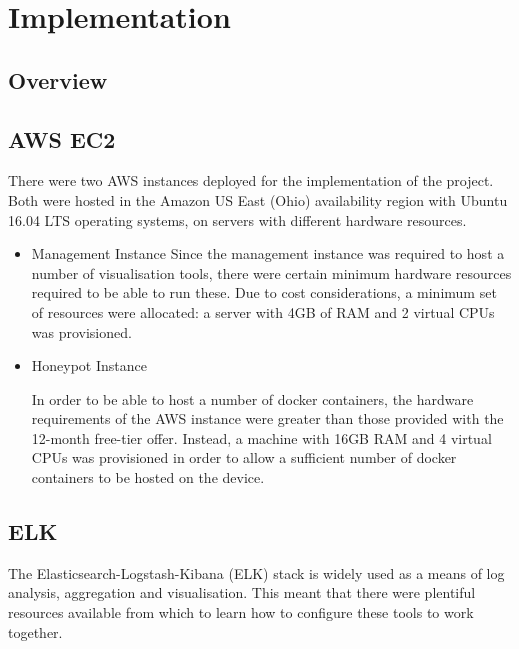 \chapter{Implementation}



\section{Overview}



\section{AWS EC2}
There were two AWS instances deployed for the implementation of the project. Both were hosted in the Amazon US East (Ohio) availability region with Ubuntu 16.04 LTS operating systems, on servers with different hardware resources.

\begin{itemize}
	
	\item Management Instance
	Since the management instance was required to host a number of visualisation tools, there were certain minimum hardware resources required to be able to run these. Due to cost considerations, a minimum set of resources were allocated: a server with 4GB of RAM and 2 virtual CPUs was provisioned. 
	
	\item Honeypot Instance
	
	In order to be able to host a number of docker containers, the hardware requirements of the AWS instance were greater than those provided with the 12-month free-tier offer. Instead, a machine with 16GB RAM and 4 virtual CPUs was provisioned in order to allow a sufficient number of docker containers to be hosted on the device. 
	
	
\end{itemize}



\section{ELK}

The Elasticsearch-Logstash-Kibana (ELK) stack is widely used as a means of log analysis, aggregation and visualisation. This meant that there were plentiful resources available from which to learn how to configure these tools to work together.

